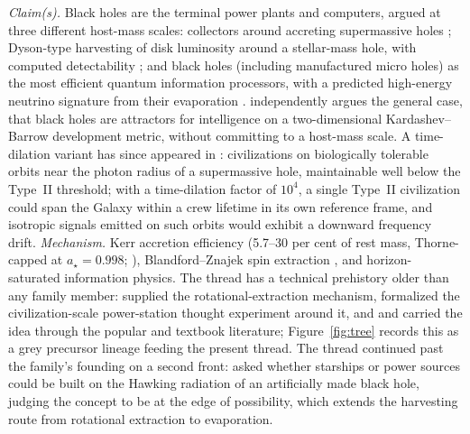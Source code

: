\documentclass[11pt]{article}
\newcommand{\astar}{\ensuremath{a_\star}}
\begin{document}
\emph{Claim(s).} Black holes are the terminal power plants and computers, argued at three different host-mass scales: collectors around accreting supermassive holes \citep{Inoue2011}; Dyson-type harvesting of disk luminosity around a stellar-mass hole, with computed detectability \citep{Hsiao2021}; and black holes (including manufactured micro holes) as the most efficient quantum information processors, with a predicted high-energy neutrino signature from their evaporation \citep{Dvali2023}. \citet{Vidal2011} independently argues the general case, that black holes are attractors for intelligence on a two-dimensional Kardashev--Barrow development metric, without committing to a host-mass scale. A time-dilation variant has since appeared in \citet{ReissFeng2026}: civilizations on biologically tolerable orbits near the photon radius of a supermassive hole, maintainable well below the Type~II threshold; with a time-dilation factor of $10^{4}$, a single Type~II civilization could span the Galaxy within a crew lifetime in its own reference frame, and isotropic signals emitted on such orbits would exhibit a downward frequency drift.
\emph{Mechanism.} Kerr accretion efficiency (5.7--30 per cent of rest mass, Thorne-capped at $\astar=0.998$; \citealt{BardeenPressTeukolsky1972,NovikovThorne1973,Thorne1974}), Blandford--Znajek spin extraction \citep{BlandfordZnajek1977,Tchekhovskoy2011}, and horizon-saturated information physics. The thread has a technical prehistory older than any family member: \citet{Penrose1969} supplied the rotational-extraction mechanism, \citet[\S 33.7]{MTW1973} formalized the civilization-scale power-station thought experiment around it, and \citet{Thorne1994} and \citet[\S 12]{FrolovNovikov1998} carried the idea through the popular and textbook literature; Figure~\ref{fig:tree} records this as a grey precursor lineage feeding the present thread. The thread continued past the family's founding on a second front: \citet{Crane2009} asked whether starships or power sources could be built on the Hawking radiation of an artificially made black hole, judging the concept to be at the edge of possibility, which extends the harvesting route from rotational extraction to evaporation.
\end{document}
